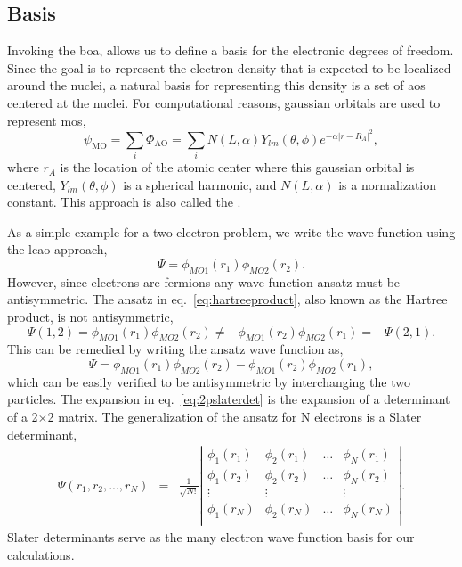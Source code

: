 \subsection{Basis}
Invoking the \gls{boa}, allows us to define a basis for the electronic degrees of freedom.
Since the goal is to represent the electron density that is expected to be localized around the nuclei, a natural basis for representing this density is a set of \glspl{ao} centered at the nuclei.
For computational reasons, gaussian orbitals are used to represent \glspl{mo},
\begin{equation}
\psi_{\textrm{MO}} = \sum_{i} \Phi_{\textrm{AO}} = \sum_{i} N(L, \alpha) Y_{lm}(\theta, \phi) e^{-\alpha |r - R_A|^2},
\end{equation}
where $r_A$ is the location of the atomic center where this gaussian orbital is centered, $Y_{lm}(\theta, \phi)$ is a spherical harmonic, and $N(L, \alpha)$ is a normalization constant.
This approach is also called the .

As a simple example for a two electron problem, we write the wave function using the \gls{lcao} approach,
\begin{equation}
\Psi = \phi_{MO1}(r_1) \phi_{MO2}(r_2).
\label{eq:hartreeproduct}
\end{equation}
However, since electrons are fermions any wave function ansatz must be antisymmetric.
The ansatz in eq.~\ref{eq:hartreeproduct}, also known as the Hartree product, is not antisymmetric,
\begin{equation}
\Psi(1,2) = \phi_{MO1}(r_1) \phi_{MO2}(r_2) \neq -\phi_{MO1}(r_2) \phi_{MO2}(r_1) = -\Psi(2,1).
\end{equation}
This can be remedied by writing the ansatz wave function as, 
\begin{equation}
\Psi = \phi_{MO1}(r_1) \phi_{MO2}(r_2) - \phi_{MO1}(r_2) \phi_{MO2}(r_1),
\label{eq:2pslaterdet}
\end{equation}
which can be easily verified to be antisymmetric by interchanging the two particles.
The expansion in eq.~\ref{eq:2pslaterdet} is the expansion of a determinant of a 2$\times$2 matrix.
The generalization of the ansatz for N electrons is a Slater determinant,
\begin{eqnarray}
	\Psi(r_1,r_2,...,r_N) &=& \frac{1}{\sqrt{N!}} 
		\left|
			\begin{array}{cccc}
				\phi_1(r_1) & \phi_2(r_1) & \ldots & \phi_N(r_1) \\
				\phi_1(r_2) & \phi_2(r_2) & \ldots & \phi_N(r_2) \\
				\vdots      & \vdots      &        & \vdots      \\
				\phi_1(r_N) & \phi_2(r_N) & \ldots & \phi_N(r_N) \\
			\end{array}
		\right|.
\end{eqnarray}
Slater determinants serve as the many electron wave function basis for our calculations.
